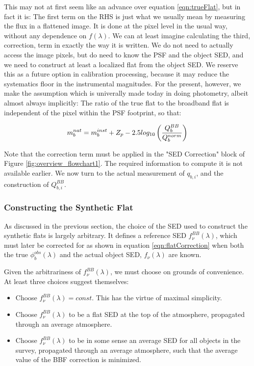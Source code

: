 \documentclass[12pt,preprint]{aastex}
\begin{document}
\noindent
This may not at first seem like an advance over equation \ref{eqn:trueFlat}, but in fact it is:  The first term on the RHS 
is just what we usually
mean by measuring the flux in a flattened image.  It is done at the pixel level in the usual way, without any dependence on 
$f(\lambda)$.  We can at least imagine calculating the third, correction, term in exactly the way it is written.  We do
not need to actually access the image pixels, but do need to know the PSF and the object SED, and we need to construct at least
a localized flat from the object SED.  We reserve this as a future option in calibration processing, because it may reduce
the systematics floor in the instrumental magnitudes.  For the present, however, we make the assumption which is univerally made
today in doing photometry, albeit almost always implicitly:  The ratio of the true flat to the broadband flat is independent 
of the pixel within the PSF footprint, so that:

\begin{equation}
m_b^{nat} =  m_b^{inst} + Z_p - 2.5 log_{10} \left( {Q_b^{BB}}  \over {Q_b^{norm}} \right) 
\label{eqn:flatCorrection}
\end{equation}

Note that the correction term must be applied in the "SED Correction" block of Figure \ref{fig:overview_flowchart1}.  The 
required information to compute it is not available earlier.  We now turn to the actual measurement of $q_{b,i}$, and the construction of $Q_{b,i}^{BB}$.

\subsubsection{Constructing the Synthetic Flat}
\label{sec:synthflat}
As discussed in the previous section, the choice of the SED used to construct the synthetic flats is largely arbitrary.  It defines a reference SED $f_\nu^{BB}(\lambda)$,
which must later be corrected for as shown in equation \ref{eqn:flatCorrection}
when both the true $\phi_b^{obs}(\lambda)$ and the actual object SED, $f_\nu(\lambda)$ are known.     

Given the arbitrariness of $f_\nu^{BB}(\lambda)$,
we must choose on grounds of convenience.  At least three choices suggest themselves:

\begin{itemize}
\item{Choose $f_\nu^{BB}(\lambda) = const$.  This has the virtue of maximal simplicity.}
\item{Choose $f_\nu^{BB}(\lambda)$ to be a flat SED at the top of the atmosphere, propagated through
an average atmosphere.}
\item{Choose $f_\nu^{BB}(\lambda)$ to be in some sense an average SED for all objects in the survey, propagated
through an average atmosphere,  such that the average value
of the BBF correction is minimized.}
\end{itemize}
\end{document}

